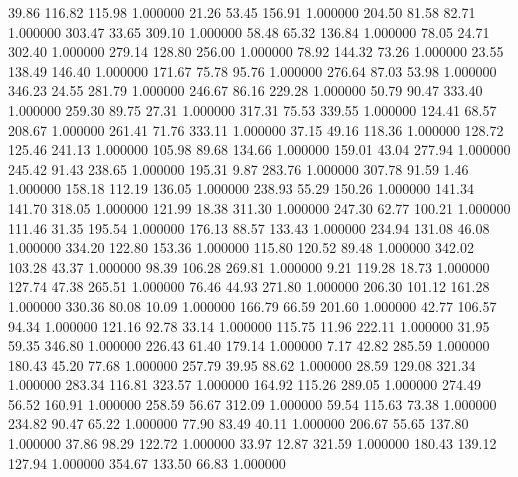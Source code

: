      39.86    116.82    115.98  1.000000
     21.26     53.45    156.91  1.000000
    204.50     81.58     82.71  1.000000
    303.47     33.65    309.10  1.000000
     58.48     65.32    136.84  1.000000
     78.05     24.71    302.40  1.000000
    279.14    128.80    256.00  1.000000
     78.92    144.32     73.26  1.000000
     23.55    138.49    146.40  1.000000
    171.67     75.78     95.76  1.000000
    276.64     87.03     53.98  1.000000
    346.23     24.55    281.79  1.000000
    246.67     86.16    229.28  1.000000
     50.79     90.47    333.40  1.000000
    259.30     89.75     27.31  1.000000
    317.31     75.53    339.55  1.000000
    124.41     68.57    208.67  1.000000
    261.41     71.76    333.11  1.000000
     37.15     49.16    118.36  1.000000
    128.72    125.46    241.13  1.000000
    105.98     89.68    134.66  1.000000
    159.01     43.04    277.94  1.000000
    245.42     91.43    238.65  1.000000
    195.31      9.87    283.76  1.000000
    307.78     91.59      1.46  1.000000
    158.18    112.19    136.05  1.000000
    238.93     55.29    150.26  1.000000
    141.34    141.70    318.05  1.000000
    121.99     18.38    311.30  1.000000
    247.30     62.77    100.21  1.000000
    111.46     31.35    195.54  1.000000
    176.13     88.57    133.43  1.000000
    234.94    131.08     46.08  1.000000
    334.20    122.80    153.36  1.000000
    115.80    120.52     89.48  1.000000
    342.02    103.28     43.37  1.000000
     98.39    106.28    269.81  1.000000
      9.21    119.28     18.73  1.000000
    127.74     47.38    265.51  1.000000
     76.46     44.93    271.80  1.000000
    206.30    101.12    161.28  1.000000
    330.36     80.08     10.09  1.000000
    166.79     66.59    201.60  1.000000
     42.77    106.57     94.34  1.000000
    121.16     92.78     33.14  1.000000
    115.75     11.96    222.11  1.000000
     31.95     59.35    346.80  1.000000
    226.43     61.40    179.14  1.000000
      7.17     42.82    285.59  1.000000
    180.43     45.20     77.68  1.000000
    257.79     39.95     88.62  1.000000
     28.59    129.08    321.34  1.000000
    283.34    116.81    323.57  1.000000
    164.92    115.26    289.05  1.000000
    274.49     56.52    160.91  1.000000
    258.59     56.67    312.09  1.000000
     59.54    115.63     73.38  1.000000
    234.82     90.47     65.22  1.000000
     77.90     83.49     40.11  1.000000
    206.67     55.65    137.80  1.000000
     37.86     98.29    122.72  1.000000
     33.97     12.87    321.59  1.000000
    180.43    139.12    127.94  1.000000
    354.67    133.50     66.83  1.000000
